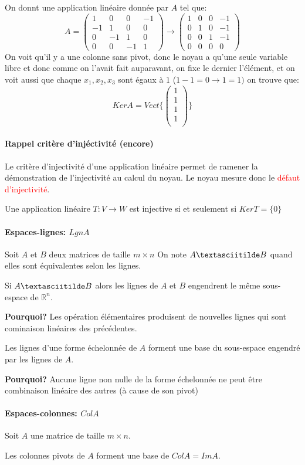 \begin{exemple}
    On donnt une application linéaire donnée par $A$ tel que:
    \[A = \begin{pmatrix}
        1 & 0 & 0 & -1\\
        -1 & 1 & 0 & 0\\
        0 & -1 & 1 & 0 \\
        0 & 0 & -1 & 1
    \end{pmatrix} \to \begin{pmatrix}
         1 & 0 & 0 & -1\\
        0 & 1 & 0 & -1\\
        0 & 0 & 1 & -1 \\
        0 & 0 & 0 & 0
    \end{pmatrix}\]
    On voit qu'il y a une colonne sans pivot, donc le noyau a qu'une seule variable libre et donc comme on l'avait fait auparavant, on fixe le dernier l'élément, et on voit aussi que chaque $x_1, x_2, x_3$ sont égaux à $1$ ($1 -1  = 0 \to 1 = 1)$ on trouve que:
    \[Ker A = Vect\{\begin{pmatrix}
        1 \\ 1 \\1 \\1 \\
    \end{pmatrix}\}\]
    
\end{exemple}

\paragraph{Rappel critère d'injéctivité (encore)}
Le critère d'injectivité d'une application linéaire permet de ramener la démonstration de l'injectivité au calcul du noyau. Le noyau mesure donc le \textcolor{red}{défaut d'injectivité}.
\begin{theoreme}
    Une application linéaire $T: V \to W$ est injective si et seulement si $Ker T = \{0\}$ 
\end{theoreme}
\paragraph{Espaces-lignes: $LgnA$}
Soit $A$ et $B$ deux matrices de taille $m\times n$ On note $A  \textasciitilde B$ quand elles sont équivalentes selon les lignes.
\begin{theoreme}
    Si $A \textasciitilde B$ alors les lignes de $A$ et $B$ engendrent le même sous-espace de $\mathbb{R}^n$.   
\end{theoreme}
\textbf{Pourquoi?} Les opération élémentaires produisent de nouvelles lignes qui sont cominaison linéaires des précédentes.
\begin{theoreme}
    Les lignes d'une forme échelonnée de $A$ forment une base du sous-espace engendré par les lignes de $A$.
\end{theoreme}
\textbf{Pourquoi?} Aucune ligne non nulle de la forme échelonnée ne peut être combinaison linéaire des autres (à cause de son pivot)

\paragraph{Espaces-colonnes: $ColA$}
Soit $A$ une matrice de taille $m \times n$.
\begin{theoreme}
    Les colonnes pivots de $A$ forment une base de $ColA = Im A$.
\end{theoreme}